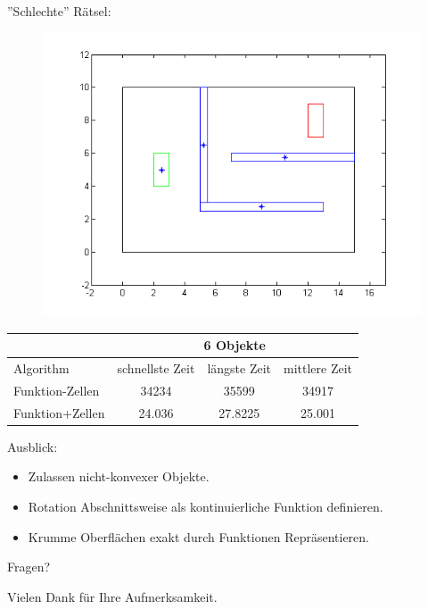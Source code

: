\documentclass[final]{beamer}
\begin{document}
\begin{frame}
''Schlechte'' Rätsel:
\begin{figure}
\includegraphics[scale = 0.3]{../thesis/riddleB.png}
\end{figure}
\begin{center}
\begin{tabular}{l||c|c|c||}
& \multicolumn{3}{c||}{6 Objekte} \\\hline\hline
Algorithm& schnellste Zeit & längste  Zeit& mittlere Zeit \\\hline
Funktion-Zellen  &  34234 &  35599 & 34917 \\
Funktion+Zellen & 24.036 & 27.8225 & 25.001 \\
\end{tabular}
\end{center}
\end{frame}

\begin{frame}
Ausblick:
\begin{itemize}
\item Zulassen nicht-konvexer Objekte.
\item Rotation Abschnittsweise als kontinuierliche Funktion definieren.
\item Krumme Oberflächen exakt durch Funktionen Repräsentieren.
\end{itemize}
\end{frame}

\begin{frame}
\begin{center}
Fragen?
\end{center}
\end{frame}

\begin{frame}
\center 
Vielen Dank für Ihre Aufmerksamkeit.
\end{frame}
\end{document}
